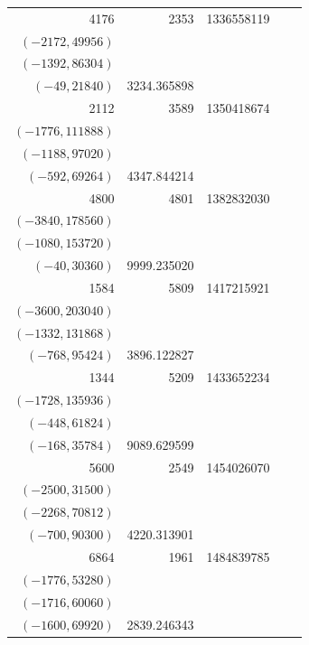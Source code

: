 \documentclass[11pt]{article}
\begin{document}
\begin{longtable}{r r r l r}
4176 & 2353 & 1336558119 & \begin{tabular}[t]{@{}l@{}}$(-2349,7830)$\\$(-2172,49956)$\\$(-1392,86304)$\\$(-49,21840)$\end{tabular} & 3234.365898\\[5pt]
2112 & 3589 & 1350418674 & \begin{tabular}[t]{@{}l@{}}$(-3364,64380)$\\$(-1776,111888)$\\$(-1188,97020)$\\$(-592,69264)$\end{tabular} & 4347.844214\\[5pt]
4800 & 4801 & 1382832030 & \begin{tabular}[t]{@{}l@{}}$(-4225,148200)$\\$(-3840,178560)$\\$(-1080,153720)$\\$(-40,30360)$\end{tabular} & 9999.235020\\[5pt]
1584 & 5809 & 1417215921 & \begin{tabular}[t]{@{}l@{}}$(-4884,170940)$\\$(-3600,203040)$\\$(-1332,131868)$\\$(-768,95424)$\end{tabular} & 3896.122827\\[5pt]
1344 & 5209 & 1433652234 & \begin{tabular}[t]{@{}l@{}}$(-4725,117810)$\\$(-1728,135936)$\\$(-448,61824)$\\$(-168,35784)$\end{tabular} & 9089.629599\\[5pt]
5600 & 2549 & 1454026070 & \begin{tabular}[t]{@{}l@{}}$(-2520,24360)$\\$(-2500,31500)$\\$(-2268,70812)$\\$(-700,90300)$\end{tabular} & 4220.313901\\[5pt]
6864 & 1961 & 1484839785 & \begin{tabular}[t]{@{}l@{}}$(-1924,25012)$\\$(-1776,53280)$\\$(-1716,60060)$\\$(-1600,69920)$\end{tabular} & 2839.246343\\[5pt]

\end{longtable}
\end{document}
